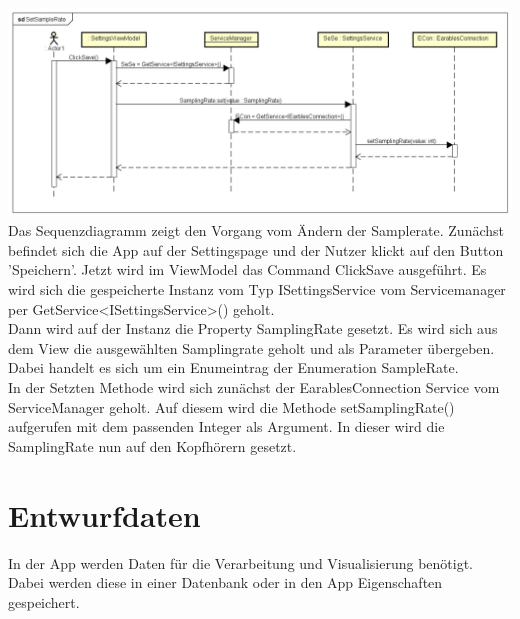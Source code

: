 \documentclass[a4paper,12pt]{article}
\begin{document}
\includegraphics[width=1.1\textwidth]{./Diagramme/SetSampleRateSeqDia.png}\\
Das Sequenzdiagramm zeigt den Vorgang vom Ändern der Samplerate.
Zunächst befindet sich die App auf der Settingspage und der Nutzer klickt auf den Button 'Speichern'. Jetzt wird im ViewModel das Command ClickSave ausgeführt. Es wird sich die gespeicherte Instanz vom Typ ISettingsService vom Servicemanager per GetService<ISettingsService>() geholt.\\
Dann wird auf der Instanz die Property SamplingRate gesetzt. Es wird sich aus dem View die ausgewählten Samplingrate geholt und als Parameter übergeben. Dabei handelt es sich um ein Enumeintrag der Enumeration SampleRate.\\
In der Setzten Methode wird sich zunächst der EarablesConnection Service vom ServiceManager geholt. 
Auf diesem wird die Methode setSamplingRate() aufgerufen mit dem passenden Integer als Argument.
In dieser wird die SamplingRate nun auf den Kopfhörern gesetzt.\\
\newpage
\section{Entwurfdaten}
In der App werden Daten für die Verarbeitung und Visualisierung benötigt. Dabei werden diese in einer Datenbank oder in den App Eigenschaften gespeichert.
\end{document}
